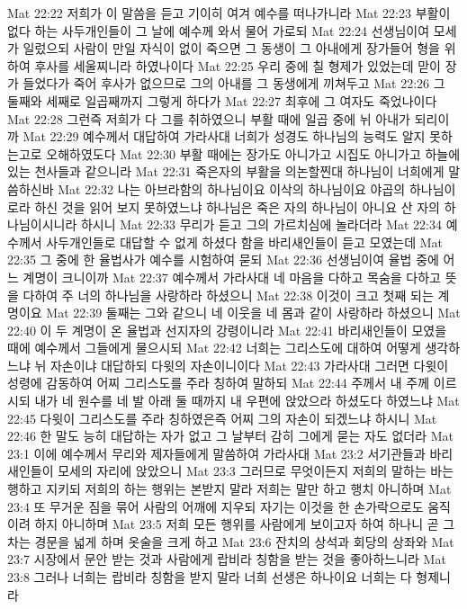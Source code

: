 Mat 22:22  저희가 이 말씀을 듣고 기이히 여겨 예수를 떠나가니라
Mat 22:23  부활이 없다 하는 사두개인들이 그 날에 예수께 와서 물어 가로되
Mat 22:24  선생님이여 모세가 일렀으되 사람이 만일 자식이 없이 죽으면 그 동생이 그 아내에게 장가들어 형을 위하여 후사를 세울찌니라 하였나이다
Mat 22:25  우리 중에 칠 형제가 있었는데 맏이 장가 들었다가 죽어 후사가 없으므로 그의 아내를 그 동생에게 끼쳐두고
Mat 22:26  그 둘째와 세째로 일곱째까지 그렇게 하다가
Mat 22:27  최후에 그 여자도 죽었나이다
Mat 22:28  그런즉 저희가 다 그를 취하였으니 부활 때에 일곱 중에 뉘 아내가 되리이까
Mat 22:29  예수께서 대답하여 가라사대 너희가 성경도 하나님의 능력도 알지 못하는고로 오해하였도다
Mat 22:30  부활 때에는 장가도 아니가고 시집도 아니가고 하늘에 있는 천사들과 같으니라
Mat 22:31  죽은자의 부활을 의논할찐대 하나님이 너희에게 말씀하신바
Mat 22:32  나는 아브라함의 하나님이요 이삭의 하나님이요 야곱의 하나님이로라 하신 것을 읽어 보지 못하였느냐 하나님은 죽은 자의 하나님이 아니요 산 자의 하나님이시니라 하시니
Mat 22:33  무리가 듣고 그의 가르치심에 놀라더라
Mat 22:34  예수께서 사두개인들로 대답할 수 없게 하셨다 함을 바리새인들이 듣고 모였는데
Mat 22:35  그 중에 한 율법사가 예수를 시험하여 묻되
Mat 22:36  선생님이여 율법 중에 어느 계명이 크니이까
Mat 22:37  예수께서 가라사대 네 마음을 다하고 목숨을 다하고 뜻을 다하여 주 너의 하나님을 사랑하라 하셨으니
Mat 22:38  이것이 크고 첫째 되는 계명이요
Mat 22:39  둘째는 그와 같으니 네 이웃을 네 몸과 같이 사랑하라 하셨으니
Mat 22:40  이 두 계명이 온 율법과 선지자의 강령이니라
Mat 22:41  바리새인들이 모였을 때에 예수께서 그들에게 물으시되
Mat 22:42  너희는 그리스도에 대하여 어떻게 생각하느냐 뉘 자손이냐 대답하되 다윗의 자손이니이다
Mat 22:43  가라사대 그러면 다윗이 성령에 감동하여 어찌 그리스도를 주라 칭하여 말하되
Mat 22:44  주께서 내 주께 이르시되 내가 네 원수를 네 발 아래 둘 때까지 내 우편에 앉았으라 하셨도다 하였느냐
Mat 22:45  다윗이 그리스도를 주라 칭하였은즉 어찌 그의 자손이 되겠느냐 하시니
Mat 22:46  한 말도 능히 대답하는 자가 없고 그 날부터 감히 그에게 묻는 자도 없더라
Mat 23:1  이에 예수께서 무리와 제자들에게 말씀하여 가라사대
Mat 23:2  서기관들과 바리새인들이 모세의 자리에 앉았으니
Mat 23:3  그러므로 무엇이든지 저희의 말하는 바는 행하고 지키되 저희의 하는 행위는 본받지 말라 저희는 말만 하고 행치 아니하며
Mat 23:4  또 무거운 짐을 묶어 사람의 어깨에 지우되 자기는 이것을 한 손가락으로도 움직이려 하지 아니하며
Mat 23:5  저희 모든 행위를 사람에게 보이고자 하여 하나니 곧 그 차는 경문을 넓게 하며 옷술을 크게 하고
Mat 23:6  잔치의 상석과 회당의 상좌와
Mat 23:7  시장에서 문안 받는 것과 사람에게 랍비라 칭함을 받는 것을 좋아하느니라
Mat 23:8  그러나 너희는 랍비라 칭함을 받지 말라 너희 선생은 하나이요 너희는 다 형제니라
